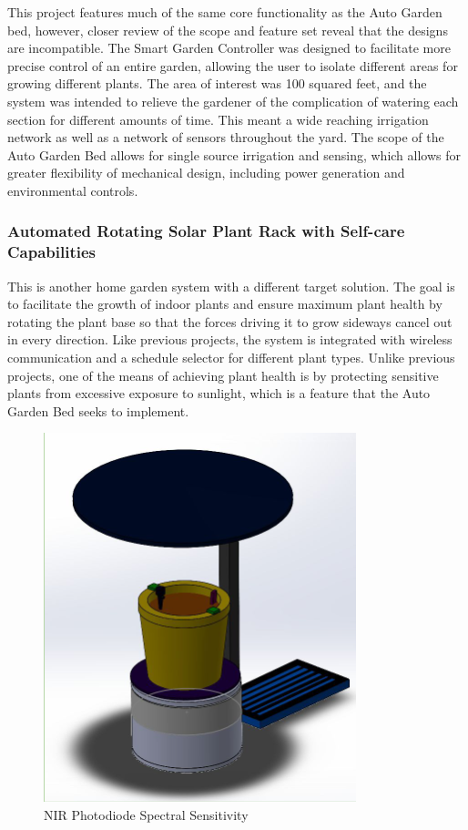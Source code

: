 This project features much of the same core functionality as the Auto Garden bed, however, closer review of the scope and feature set reveal that the designs are incompatible. The Smart Garden Controller was designed to facilitate more precise control of an entire garden, allowing the user to isolate different areas for growing different plants. The area of interest was 100 squared feet, and the system was intended to relieve the gardener of the complication of watering each section for different amounts of time. This meant a wide reaching irrigation network as well as a network of sensors throughout the yard. The scope of the Auto Garden Bed allows for single source irrigation and sensing, which allows for greater flexibility of mechanical design, including power generation and environmental controls.

\subsubsection{Automated Rotating Solar Plant Rack with Self-care Capabilities}

This is another home garden system with a different target solution. The goal is to facilitate the growth of indoor plants and ensure maximum plant health by rotating the plant base so that the forces driving it to grow sideways cancel out in every direction. Like previous projects, the system is integrated with wireless communication and a schedule selector for different plant types. Unlike previous projects, one of the means of achieving plant health is by protecting sensitive plants from excessive exposure to sunlight, which is a feature that the Auto Garden Bed seeks to implement. 

\begin{figure}[H]
    \caption{NIR Photodiode Spectral Sensitivity}
    \centering
    \includegraphics[width=.6\textwidth]{images/3.1.4Pic.png}
\end{figure}

